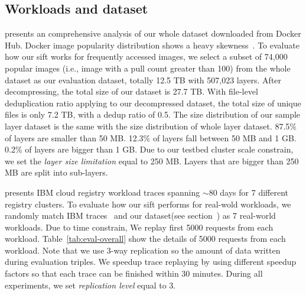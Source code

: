 \subsection{Workloads and dataset}
\cite{xxx} presents an comprehensive analysis of our whole dataset downloaded from Docker Hub. 
Docker image popularity distribution shows a heavy skewness~\cite{xxx}.
To evaluate how our sift works for frequently accessed images,
we select a subset of 74,000 popular images (i.e., image with a pull count greater than 100) from the whole dataset 
as our evaluation dataset, 
totally 12.5 TB with 507,023 layers.
After decompressing,  the total size of our dataset is 27.7 TB.
With file-level deduplication ratio applying to our decompressed dataset, 
the total size of unique files is only 7.2 TB, with a dedup ratio of 0.5.
The size distribution of our sample layer dataset is the same with the size distribution of whole layer dataset.
87.5\% of layers are smaller than 50 MB.
12.3\% of layers fall between 50 MB and 1 GB.
0.2\% of layers are bigger than 1 GB.
Due to our testbed cluster scale constrain, we set the \emph{layer size limitation} equal to 250 MB. 
Layers that are bigger than 250 MB are split into sub-layers.

\cite{dockerworkload} presents IBM cloud registry workload traces spanning $\sim$80 days for 7 different registry clusters. 
To evaluate how our sift performs for real-wold workloads,
we randomly match IBM traces~\cite{xxx} and our dataset(see section~\cite{xxx}) as 7 real-world workloads. 
Due to time constrain,
We replay first 5000 requests from each workload.
Table~\ref{tab:eval-overall} show the details of 5000 requests from each workload.
Note that we use 3-way replication
so the amount of data written during evaluation triples.
We speedup trace replaying by using different speedup factors
so that each trace can be finished within 30 minutes.
During all experiments,
we set \emph{replication level} equal to 3.





